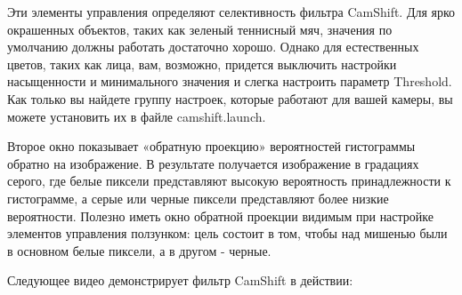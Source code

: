 Эти элементы управления определяют селективность фильтра CamShift. Для ярко окрашенных объектов, таких как зеленый теннисный мяч, значения по умолчанию должны работать достаточно хорошо. Однако для естественных цветов, таких как лица, вам, возможно, придется выключить настройки насыщенности и минимального значения и слегка настроить параметр Threshold. Как только вы найдете группу настроек, которые работают для вашей камеры, вы можете установить их в файле camshift.launch.

Второе окно показывает «обратную проекцию» вероятностей гистограммы обратно на изображение. В результате получается изображение в градациях серого, где белые пиксели представляют высокую вероятность принадлежности к гистограмме, а серые или черные пиксели представляют более низкие вероятности. Полезно иметь окно обратной проекции видимым при настройке элементов управления ползунком: цель состоит в том, чтобы над мишенью были в основном белые пиксели, а в другом - черные.

Следующее видео демонстрирует фильтр CamShift в действии:

